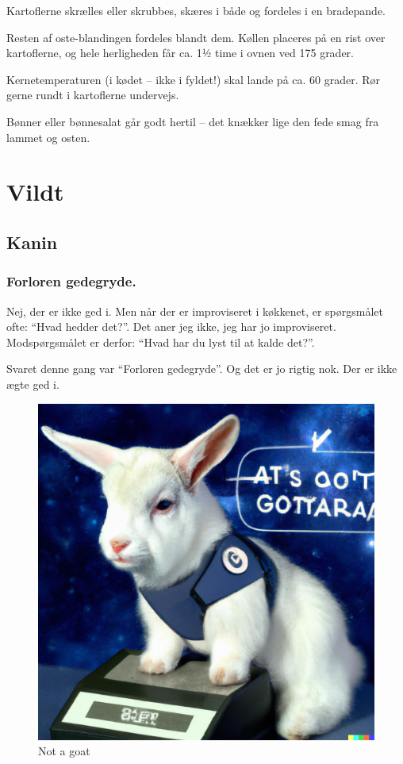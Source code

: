 \documentclass[
]{book}
\begin{document}
Kartoflerne skrælles eller skrubbes, skæres i både og fordeles i en bradepande.

Resten af oste-blandingen fordeles blandt dem. Køllen placeres på en rist over kartoflerne, og hele herligheden får ca. 1½ time i ovnen ved 175 grader.

Kernetemperaturen (i kødet -- ikke i fyldet!) skal lande på ca. 60 grader. Rør gerne rundt i kartoflerne undervejs.

Bønner eller bønnesalat går godt hertil -- det knækker lige den fede smag fra lammet og osten.

\hypertarget{vildt}{%
\chapter{Vildt}\label{vildt}}

\hypertarget{kanin}{%
\section{Kanin}\label{kanin}}

\hypertarget{forloren-gedegryde.}{%
\subsection{Forloren gedegryde.}\label{forloren-gedegryde.}}

Nej, der er ikke ged i. Men når der er improviseret i køkkenet, er spørgsmålet
ofte: ``Hvad hedder det?''. Det aner jeg ikke, jeg har jo improviseret.
Modspørgsmålet er derfor: ``Hvad har du lyst til at kalde det?''.

Svaret denne gang var ``Forloren gedegryde''. Og det er jo rigtig nok. Der er ikke
ægte ged i.

\begin{figure}
\centering
\includegraphics{images/DALL-E-notagoat.png}
\caption{Not a goat}
\end{figure}
\end{document}
